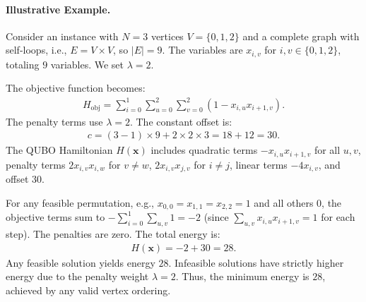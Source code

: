 \documentclass[12pt]{article}
\begin{document}
\paragraph{Illustrative Example.}
Consider an instance with $N=3$ vertices $V=\{0,1,2\}$ and a complete graph with self-loops, i.e., $E = V \times V$, so $|E|=9$. The variables are $x_{i,v}$ for $i,v \in \{0,1,2\}$, totaling $9$ variables. We set $\lambda = 2$.

The objective function becomes:
\begin{align}
H_{\text{obj}} = \sum_{i=0}^{1} \sum_{u=0}^{2} \sum_{v=0}^{2} \left( 1 - x_{i,u} x_{i+1,v} \right).
\end{align}
The penalty terms use $\lambda=2$. The constant offset is:
\begin{align}
c = (3-1) \times 9 + 2 \times 2 \times 3 = 18 + 12 = 30.
\end{align}
The QUBO Hamiltonian $H(\mathbf{x})$ includes quadratic terms $-x_{i,u} x_{i+1,v}$ for all $u,v$, penalty terms $2 x_{i,v} x_{i,w}$ for $v \neq w$, $2 x_{i,v} x_{j,v}$ for $i \neq j$, linear terms $-4 x_{i,v}$, and offset $30$.

For any feasible permutation, e.g., $x_{0,0}=x_{1,1}=x_{2,2}=1$ and all others $0$, the objective terms sum to $-\sum_{i=0}^{1} \sum_{u,v} 1 = -2$ (since $\sum_{u,v} x_{i,u} x_{i+1,v} = 1$ for each step). The penalties are zero. The total energy is:
\begin{align}
H(\mathbf{x}) = -2 + 30 = 28.
\end{align}
Any feasible solution yields energy $28$. Infeasible solutions have strictly higher energy due to the penalty weight $\lambda=2$. Thus, the minimum energy is $28$, achieved by any valid vertex ordering.
\end{document}
